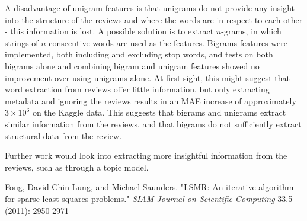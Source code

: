 \documentclass[11pt]{amsart}
\begin{document}
A disadvantage of unigram features is that unigrams do not provide any insight into the structure of the reviews and where the words are in respect to each other - this information is lost. A possible solution is to extract $n$-grams, in which strings of $n$ consecutive words are used as the features. Bigrams features were implemented, both including and excluding stop words, and tests on both bigrams alone and combining bigram and unigram features showed no improvement over using unigrams alone. At first sight, this might suggest that word extraction from reviews offer little information, but only extracting metadata and ignoring the reviews results in an MAE increase of approximately $3\times10^6$ on the Kaggle data. This suggests that bigrams and unigrams extract similar information from the reviews, and that bigrams do not sufficiently extract structural data from the review.

Further work would look into extracting more insightful information from the reviews, such as through a topic model.

\begingroup
\begin{thebibliography}{9}

Fong, David Chin-Lung, and Michael Saunders. "LSMR: An iterative algorithm for sparse least-squares problems."
\emph{SIAM Journal on Scientific Computing} 33.5 (2011): 2950-2971

\end{thebibliography}
\endgroup
\end{document}
